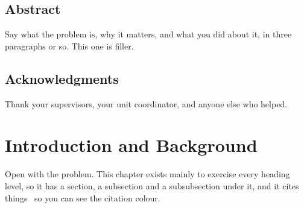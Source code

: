 \documentclass[11pt,twoside,openany]{report}
\begin{document}


\pagestyle{plain}

\section*{Abstract}
\thispagestyle{empty}

Say what the problem is, why it matters, and what you did about it, in three
paragraphs or so. This one is filler.

\lipsum[1]

\lipsum[2]

\clearpage
{}

\section*{Acknowledgments}

Thank your supervisors, your unit coordinator, and anyone else who helped.

\lipsum[3]

\clearpage



\pagestyle{fancy}

\chapter{Introduction and Background}

Open with the problem. This chapter exists mainly to exercise every heading
level, so it has a section, a subsection and a subsubsection under it, and it
cites things~\citep{smith2024example} so you can see the citation colour.
\end{document}
